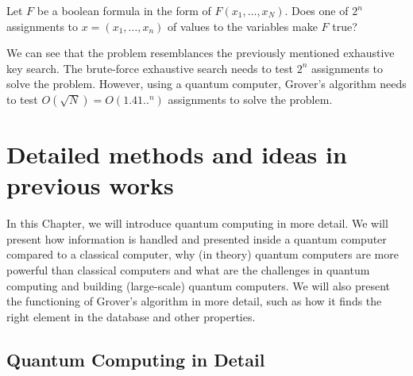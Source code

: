 \documentclass[english,oneside,openright]{UH_DS_report}
\begin{document}
Let $F$ be a boolean formula in the form of $F(x_{1}, \ldots, x_{N})$. Does one of $2^{n}$ assignments to $x = (x_{1}, \ldots, x_{n})$ of values to the variables make $F$ true?

We can see that the problem resemblances the previously mentioned exhaustive key search. The brute-force exhaustive search needs to test $2^{n}$ assignments to solve the problem. However, using a quantum computer, Grover's algorithm needs to test $O(\sqrt{N}) = O(1.41..^{n})$ assignments to solve the problem.

\chapter{Detailed methods and ideas in previous works}
\label{chapter:previouswork}

In this Chapter, we will introduce quantum computing in more detail. We will present how information is handled and presented inside a quantum computer compared to a classical computer, why (in theory) quantum computers are more powerful than classical computers and what are the challenges in quantum computing and building (large-scale) quantum computers. We will also present the functioning of Grover's algorithm in more detail, such as how it finds the right element in the database and other properties.

\section{Quantum Computing in Detail}
\end{document}
